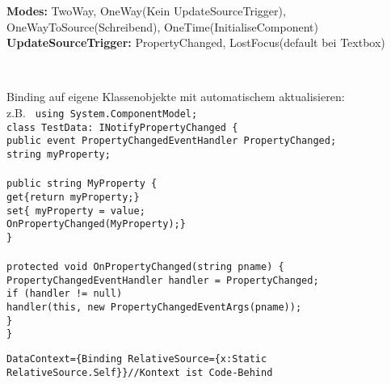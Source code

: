 \textbf{Modes:} TwoWay, OneWay(Kein UpdateSourceTrigger), OneWayToSource(Schreibend), OneTime(InitialiseComponent)\\
\textbf{UpdateSourceTrigger:} PropertyChanged, LostFocus(default bei Textbox)  

\texttt{%
	\\
 }



Binding auf eigene Klassenobjekte mit automatischem aktualisieren: \\
z.B. \texttt{ using System.ComponentModel;\\
class TestData: INotifyPropertyChanged \{			\\
\tab public event PropertyChangedEventHandler PropertyChanged;		\\
\tab string myProperty;													\\ \\ 
\tab public string MyProperty \{ \\
\tab \tab  get\{return myProperty;\} \\
\tab \tab set\{ myProperty = value; \\
\tab \tab \tab OnPropertyChanged(\dq  MyProperty\dq  );\}\\
\tab \} \\ \\
\tab protected void OnPropertyChanged(string pname) \{ \\
\tab \tab PropertyChangedEventHandler handler = PropertyChanged;\\
\tab \tab if (handler != null)											\\
\tab \tab \tab handler(this, new PropertyChangedEventArgs(pname));		\\
\tab \tab \}\\
\tab \}
}



\texttt{DataContext=\dq  \{Binding RelativeSource=\{x:Static \\ \tab RelativeSource.Self\}\}\dq   \tab \tab //Kontext ist Code-Behind}



